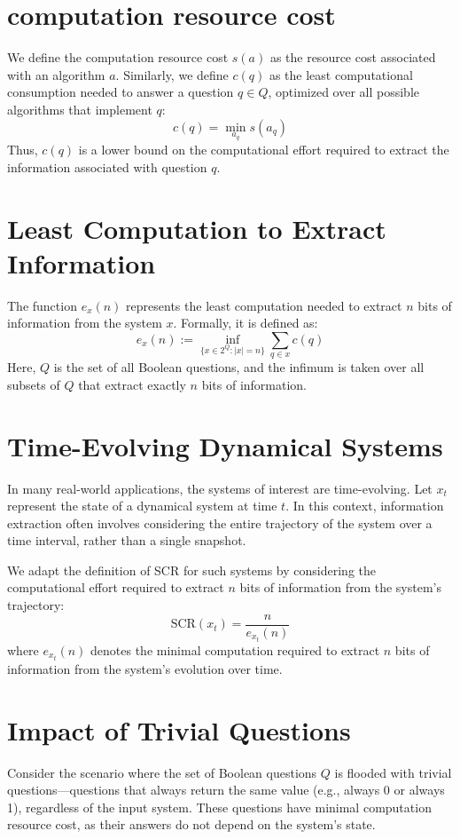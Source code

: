 \documentclass[11pt,a4paper]{article}
\theoremstyle{definition}
\theoremstyle{remark}
\numberwithin{equation}{section}
\begin{document}
\section{computation resource cost}
We define the computation resource cost \(s(a)\) as the resource cost associated with an algorithm \(a\). Similarly, we define \(c(q)\) as the least computational consumption needed to answer a question \(q \in Q\), optimized over all possible algorithms that implement \(q\):
\[
c(q) = \min_{a_q} s(a_q)
\]
Thus, \(c(q)\) is a lower bound on the computational effort required to extract the information associated with question \(q\).

\section{Least Computation to Extract Information}
The function \(e_x(n)\) represents the least computation needed to extract \(n\) bits of information from the system \(x\). Formally, it is defined as:
\[
e_x(n) := \inf_{\{x \in 2^Q : |x|=n\}} \sum_{q \in x} c(q)
\]
Here, \(Q\) is the set of all Boolean questions, and the infimum is taken over all subsets of \(Q\) that extract exactly \(n\) bits of information.

\section{Time-Evolving Dynamical Systems}
In many real-world applications, the systems of interest are time-evolving. Let \(x_t\) represent the state of a dynamical system at time \(t\). In this context, information extraction often involves considering the entire trajectory of the system over a time interval, rather than a single snapshot.

We adapt the definition of SCR for such systems by considering the computational effort required to extract \(n\) bits of information from the system's trajectory:
\[
\text{SCR}(x_t) = \frac{n}{e_{x_t}(n)}
\]
where \(e_{x_t}(n)\) denotes the minimal computation required to extract \(n\) bits of information from the system's evolution over time.

\section{Impact of Trivial Questions}
Consider the scenario where the set of Boolean questions \(Q\) is flooded with trivial questions—questions that always return the same value (e.g., always 0 or always 1), regardless of the input system. These questions have minimal computation resource cost, as their answers do not depend on the system's state.
\end{document}
